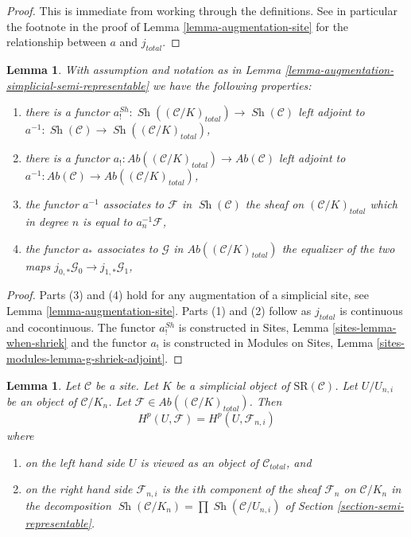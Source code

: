 \documentclass[10pt,a4paper]{amsart}
\theoremstyle{plain}
\newtheorem{lemma}[subsection]{Lemma}
\theoremstyle{definition}
\theoremstyle{remark}
\numberwithin{equation}{subsection}
\def\Sh{\mathop{\mathit{Sh}}\nolimits}
\begin{document}
\begin{proof}
This is immediate from working through the definitions.
See in particular the footnote in the proof of
Lemma \ref{lemma-augmentation-site}
for the relationship between $a$ and $j_{total}$.
\end{proof}

\begin{lemma}
\label{lemma-comparison}
With assumption and notation as in
Lemma \ref{lemma-augmentation-simplicial-semi-representable}
we have the following properties:
\begin{enumerate}
\item there is a functor
$a^{Sh}_! : \Sh((\mathcal{C}/K)_{total}) \to \Sh(\mathcal{C})$
left adjoint to $a^{-1} : \Sh(\mathcal{C}) \to \Sh((\mathcal{C}/K)_{total})$,
\item there is a functor
$a_! : \textit{Ab}((\mathcal{C}/K)_{total}) \to \textit{Ab}(\mathcal{C})$
left adjoint to
$a^{-1} : \textit{Ab}(\mathcal{C}) \to \textit{Ab}((\mathcal{C}/K)_{total})$,
\item the functor $a^{-1}$ associates to
$\mathcal{F}$ in $\Sh(\mathcal{C})$ the sheaf on $(\mathcal{C}/K)_{total}$
which in degree $n$ is equal to $a_n^{-1}\mathcal{F}$,
\item the functor $a_*$ associates to $\mathcal{G}$ in
$\textit{Ab}((\mathcal{C}/K)_{total})$ the equalizer of the two maps
$j_{0, *}\mathcal{G}_0 \to j_{1, *}\mathcal{G}_1$,
\end{enumerate}
\end{lemma}

\begin{proof}
Parts (3) and (4) hold for any augmentation of a
simplicial site, see Lemma \ref{lemma-augmentation-site}.
Parts (1) and (2) follow as $j_{total}$ is continuous and cocontinuous.
The functor $a^{Sh}_!$ is constructed in
Sites, Lemma \ref{sites-lemma-when-shriek}
and the functor $a_!$ is constructed in
Modules on Sites, Lemma
\ref{sites-modules-lemma-g-shriek-adjoint}.
\end{proof}

\begin{lemma}
\label{lemma-sanity-check-simplicial-semi-representable}
Let $\mathcal{C}$ be a site. Let $K$ be a simplicial object of
$\text{SR}(\mathcal{C})$. Let $U/U_{n, i}$ be an object of
$\mathcal{C}/K_n$. Let
$\mathcal{F} \in \textit{Ab}((\mathcal{C}/K)_{total})$.
Then
$$
H^p(U, \mathcal{F}) = H^p(U, \mathcal{F}_{n, i})
$$
where
\begin{enumerate}
\item on the left hand side $U$ is viewed as an object of
$\mathcal{C}_{total}$, and
\item on the right hand side $\mathcal{F}_{n, i}$ is the $i$th
component of the sheaf $\mathcal{F}_n$ on $\mathcal{C}/K_n$
in the decomposition $\Sh(\mathcal{C}/K_n) = \prod \Sh(\mathcal{C}/U_{n, i})$
of Section \ref{section-semi-representable}.
\end{enumerate}
\end{lemma}
\end{document}
